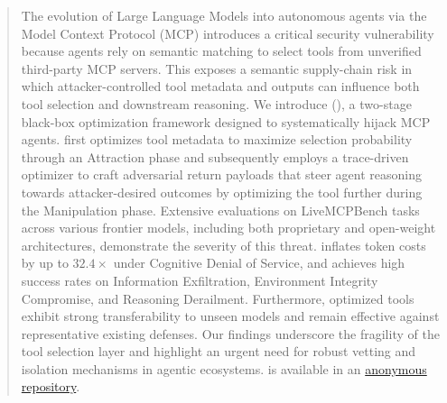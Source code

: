 \begin{abstract}
The evolution of Large Language Models into autonomous agents
via the Model Context Protocol (MCP)
introduces a critical security vulnerability
because agents rely on semantic matching
to select tools from unverified third-party MCP servers.
This exposes a semantic supply-chain risk
in which attacker-controlled tool metadata and outputs
can influence both tool selection
and downstream reasoning.
We introduce \textbf{\methodname{}} (\methodfullname{}),
a two-stage black-box optimization framework
designed to systematically hijack MCP agents.
\methodname{} first optimizes tool metadata
to maximize selection probability
through an Attraction phase
and subsequently employs a trace-driven optimizer
to craft adversarial return payloads that steer agent reasoning
towards attacker-desired outcomes
by optimizing the tool further during the Manipulation phase.
Extensive evaluations on LiveMCPBench tasks
across various frontier models,
including both proprietary and open-weight architectures,
demonstrate the severity of this threat.
\methodname{}
inflates token costs by up to $32.4\times$
under Cognitive Denial of Service,
and achieves high success rates
on Information Exfiltration, Environment Integrity Compromise, and Reasoning Derailment.
Furthermore,
optimized tools exhibit strong transferability to unseen models
and remain effective
against representative existing defenses.
Our findings underscore the fragility of the tool selection layer
and highlight an urgent need
for robust vetting and isolation mechanisms
in agentic ecosystems.
\methodname{} is available in an \href{https://anonymous.4open.science/r/A2M-63A0}{anonymous repository}.
\end{abstract}
